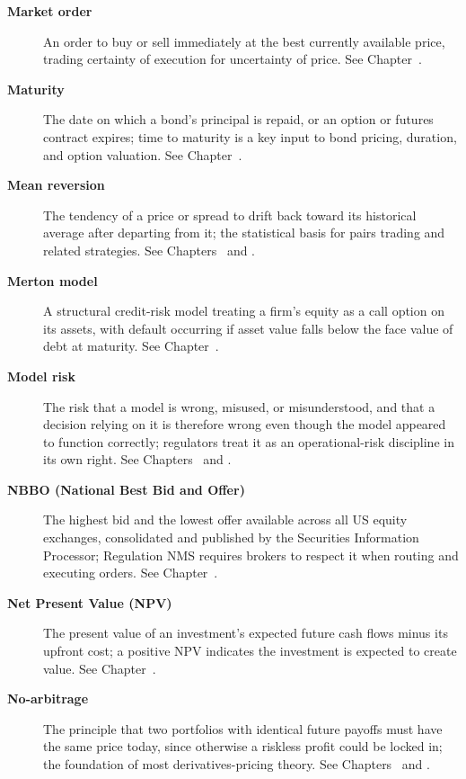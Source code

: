 \documentclass[../ai_in_finance]{subfiles}
\begin{document}
\begin{description}
\item[\textbf{Market order}] An order to buy or sell immediately at the best currently available price, trading certainty of execution for uncertainty of price. See Chapter~.

\item[\textbf{Maturity}] The date on which a bond's principal is repaid, or an option or futures contract expires; time to maturity is a key input to bond pricing, duration, and option valuation. See Chapter~.

\item[\textbf{Mean reversion}] The tendency of a price or spread to drift back toward its historical average after departing from it; the statistical basis for pairs trading and related strategies. See Chapters~ and .

\item[\textbf{Merton model}] A structural credit-risk model treating a firm's equity as a call option on its assets, with default occurring if asset value falls below the face value of debt at maturity. See Chapter~.


\item[\textbf{Model risk}] The risk that a model is wrong, misused, or misunderstood, and that a decision relying on it is therefore wrong even though the model appeared to function correctly; regulators treat it as an operational-risk discipline in its own right. See Chapters~ and .

\item[\textbf{NBBO (National Best Bid and Offer)}] The highest bid and the lowest offer available across all US equity exchanges, consolidated and published by the Securities Information Processor; Regulation NMS requires brokers to respect it when routing and executing orders. See Chapter~.

\item[\textbf{Net Present Value (NPV)}] The present value of an investment's expected future cash flows minus its upfront cost; a positive NPV indicates the investment is expected to create value. See Chapter~.

\item[\textbf{No-arbitrage}] The principle that two portfolios with identical future payoffs must have the same price today, since otherwise a riskless profit could be locked in; the foundation of most derivatives-pricing theory. See Chapters~ and .


\end{description}
\end{document}
